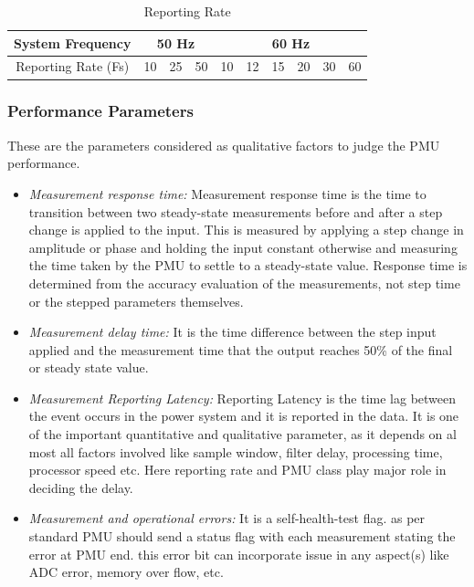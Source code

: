 \begin{table}
	\begin{center}
		\setlength\arrayrulewidth{1pt}
		\begin{tabular}{|c|c|c|c|c|c|c|c|c|c|}
			\hline
			System Frequency & \multicolumn{3}{c}{50 Hz} & \multicolumn{6}{|c|}{60 Hz}\\
			\hline 
			Reporting Rate (Fs)& 10 & 25 & 50 & 	10& 12 &15 & 20 & 30 & 60\\
			\hline
		\end{tabular}
	\end{center}
		\caption{Reporting Rate}
\end{table}
 

\subsubsection{Performance Parameters}
These are the parameters considered as qualitative factors to judge the PMU performance. 

\begin{itemize}
	\item  \textit{Measurement response time:} Measurement response time is the time to transition between two steady-state measurements before and
	after a step change is applied to the input. This is measured by applying a step change in amplitude or phase and holding the input constant otherwise and measuring the time taken  by the PMU to settle to a steady-state value. Response time is determined from the accuracy evaluation of the measurements, not step time or the stepped	parameters themselves.
	\item \textit{Measurement delay time:} It is the time difference between the step input applied and the measurement time that the output reaches 50\% of the final or steady state value.  
	\item \textit{Measurement Reporting Latency:} Reporting Latency is the time lag between the event occurs in the power system and it is reported in the data. It is one of the important quantitative and qualitative parameter, as it depends on al most all factors involved like sample window, filter delay, processing time, processor speed etc. Here reporting rate and PMU class play major role in deciding the delay. 
	\item \textit{Measurement and operational errors:} It is a self-health-test flag. as per standard PMU should send a status flag with each measurement stating the error at PMU end. this error bit can incorporate issue in any aspect(s) like ADC error, memory over flow, etc.
\end{itemize}


